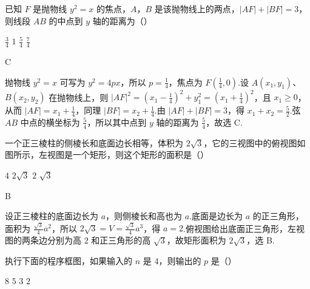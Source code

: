 \begin{problem}
已知 \(F\) 是抛物线 \(y^{2}=x\) 的焦点，\(A\)，\(B\) 是该抛物线上的两点，\(|AF|+|BF|=3\)，则线段 \(AB\) 的中点到 \(y\) 轴的距离为（\quad）

\choices
    {\( \frac{3}{4} \)}
    {\(1\)}
    {\( \frac{5}{4} \)}
    {\( \frac{7}{4} \)}
\end{problem}

\begin{answer}
C
\end{answer}

\begin{solution}
抛物线 \(y^2=x\) 可写为 \(y^2=4px\)，所以 \(p=\tfrac14\)，焦点为 \(F(\tfrac14,0)\).设 \(A(x_1,y_1)\)、\(B(x_2,y_2)\) 在抛物线上，则
\(\displaystyle |AF|^2=(x_1-\tfrac14)^2+y_1^2=(x_1+\tfrac14)^2\)，且 \(x_1\geq0\)，从而 \(|AF|=x_1+\tfrac14\)，同理 \(|BF|=x_2+\tfrac14\).由 \(|AF|+|BF|=3\)，得 \(x_1+x_2=\tfrac52\).弦 \(AB\) 中点的横坐标为 \(\tfrac54\)，所以其中点到 \(y\) 轴的距离为 \(\tfrac54\)，故选 C.
\end{solution}

\begin{problem}
一个正三棱柱的侧棱长和底面边长相等，体积为 \(2\sqrt{3}\)，它的三视图中的俯视图如图所示，左视图是一个矩形，则这个矩形的面积是（\quad）


\choices
    {\(4\)}
    {\(2\sqrt{3}\)}
    {\(2\)}
    {\(\sqrt{3}\)}
\end{problem}

\begin{answer}
B
\end{answer}

\begin{solution}
设正三棱柱的底面边长为 \(a\)，则侧棱长和高也为 \(a\).底面是边长为 \(a\) 的正三角形，面积为 \(\tfrac{\sqrt3}{4}a^2\)，所以
\(\displaystyle 2\sqrt3=V=\frac{\sqrt3}{4}a^3\)，得 \(a=2\).俯视图给出底面正三角形，左视图的两条边分别为高 \(2\) 和正三角形的高 \(\sqrt3\)，故矩形面积为 \(2\sqrt3\)，选 B.
\end{solution}

\begin{problem}
执行下面的程序框图，如果输入的 \(n\) 是 4，则输出的 \(p\) 是（\quad）


\choices
    {\(8\)}
    {\(5\)}
    {\(3\)}
    {\(2\)}
\end{problem}

